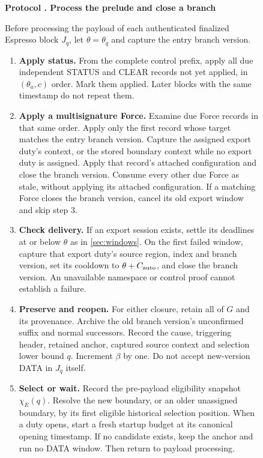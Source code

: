 \documentclass[11pt,a4paper]{article}
\newcounter{protocol}
\newenvironment{protocol}[3][htbp]{\begin{figure}[#1]\refstepcounter{protocol}\label{#2}
\begin{mdframed}[linewidth=.6pt,skipabove=0pt,skipbelow=0pt,
innertopmargin=7pt,innerbottommargin=7pt]\small
\textbf{Protocol \theprotocol. #3}\par\smallskip}{\end{mdframed}\end{figure}}
\begin{document}
\begin{protocol}{alg:force}{Process the prelude and close a branch}
Before processing the payload of each authenticated finalized Espresso
block $J_q$, let $\theta=\theta_q$ and capture the entry branch version.
\begin{enumerate}[label=\textbf{\arabic*)},itemsep=3pt]
\item \textbf{Apply status.} From the complete control prefix, apply
all due independent STATUS and CLEAR records not yet applied, in
$(\theta_a,c)$ order. Mark them applied. Later blocks with the same
timestamp do not repeat them.

\item \textbf{Apply a multisignature Force.} Examine due Force
records in that same order. Apply only the first record whose target
matches the entry branch version. Capture the assigned export duty's context,
or the stored boundary context while no export duty is assigned. Apply that record's
attached configuration and close the branch version. Consume every other due
Force as stale, without applying its attached configuration. If a
matching Force closes the branch version, cancel its old export window and
skip step 3.

\item \textbf{Check delivery.} If an export session exists, settle
its deadlines at or below $\theta$ as in \cref{sec:windows}.
On the first failed window, capture that export duty's source region,
index and branch version,
set its cooldown to $\theta+C_{\rm auto}$, and close the branch version.
An unavailable namespace or control proof cannot establish a failure.

\item \textbf{Preserve and reopen.} For either closure, retain all
of $G$ and its provenance. Archive the old branch version's unconfirmed suffix
and normal successors. Record the cause, triggering header, retained
anchor, captured source context and selection lower bound $q$.
Increment $\beta$ by one. Do not accept new-version DATA in $J_q$ itself.

\item \textbf{Select or wait.} Record the pre-payload eligibility
snapshot $\chi_E(q)$. Resolve the new boundary, or an older unassigned
boundary, by its first eligible historical selection position.
When a duty opens, start a fresh startup budget at its canonical
opening timestamp. If no candidate exists, keep the anchor and run
no DATA window. Then return to payload processing.
\end{enumerate}
\end{protocol}
\end{document}
